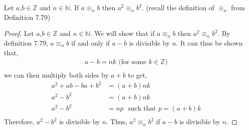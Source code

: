 \documentclass[12pt]{article}
\newenvironment{theorem}[2][Theorem]{\begin{trivlist}
\item[\hskip \labelsep {\bfseries #1}\hskip \labelsep {\bfseries #2.}]}{\end{trivlist}}
\begin{document}
\section{}
\begin{theorem}{4}
	Let $a$,$b \in \mathbb{Z}$ and $n \in \mathbb{N}$. If $a \equiv_n b$ then $a^2 \equiv_n b^2$. (recall the definition of $\equiv_n$ from Definition 7.79)
	\end{theorem}

	\begin{proof}
	Let $a$,$b \in \mathbb{Z}$ and $n \in \mathbb{N}$. We will show that if $a \equiv_n b$ then $a^2 \equiv_n b^2$.
	By definition 7.79, $a \equiv_n b$ if and only if $a-b$ is divisible by $n$. It can thus be shown that,
	\begin{align*}
		a-b=nk \text{ (for some $k \in \mathbb{Z}$)}\\
	\end{align*}
	we can then multiply both sides by $a+b$ to get,
	\begin{align*}
		a^2+ab-ba+b^2&=(a+b)nk\\
		a^2-b^2&=(a+b)nk\\
		a^2-b^2&=np \text{  }\boxed{\text{such that $p=(a+b)k$}}\\
	\end{align*}
	Therefore, $a^2-b^2$ is divisible by $n$. 
	Thus, $a^2 \equiv_n b^2$ if $a-b$ is divisible by $n$.
\end{proof}
\end{document}
